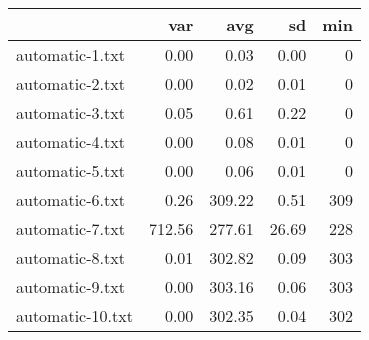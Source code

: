 \begin{tabular}{lrrrr}
  \toprule  & var & avg & sd & min \\ 
  \midrule automatic-1.txt & 0.00 & 0.03 & 0.00 & 0 \\ 
  automatic-2.txt & 0.00 & 0.02 & 0.01 & 0 \\ 
  automatic-3.txt & 0.05 & 0.61 & 0.22 & 0 \\ 
  automatic-4.txt & 0.00 & 0.08 & 0.01 & 0 \\ 
  automatic-5.txt & 0.00 & 0.06 & 0.01 & 0 \\ 
  automatic-6.txt & 0.26 & 309.22 & 0.51 & 309 \\ 
  automatic-7.txt & 712.56 & 277.61 & 26.69 & 228 \\ 
  automatic-8.txt & 0.01 & 302.82 & 0.09 & 303 \\ 
  automatic-9.txt & 0.00 & 303.16 & 0.06 & 303 \\ 
  automatic-10.txt & 0.00 & 302.35 & 0.04 & 302 \\ 
   \bottomrule \end{tabular}
